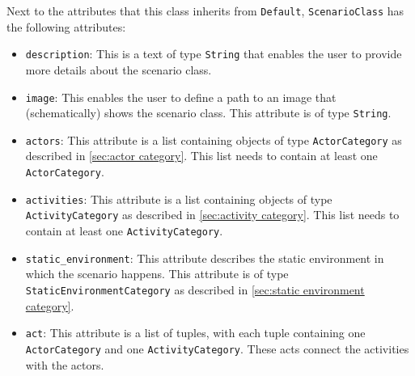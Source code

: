 \documentclass[10pt,final,a4paper,oneside,onecolumn]{article}
\theoremstyle{plain}\newtheorem{definition}{Definition}[section]    %
\theoremstyle{definition}\newtheorem{example}{Example}[section]     %
\theoremstyle{remark}\newtheorem{remarkenv}{Remark}[section]        %
\begin{document}
Next to the attributes that this class inherits from \texttt{Default}, \texttt{ScenarioClass} has the following attributes:
\begin{itemize}
	\item \texttt{description}: This is a text of type \texttt{String} that enables the user to provide more details about the scenario class.
	\item \texttt{image}: This enables the user to define a path to an image that (schematically) shows the scenario class. This attribute is of type \texttt{String}.
	\item \texttt{actors}: This attribute is a list containing objects of type \texttt{ActorCategory} as described in \cref{sec:actor category}. This list needs to contain at least one \texttt{ActorCategory}.
	\item \texttt{activities}: This attribute is a list containing objects of type \texttt{ActivityCategory} as described in \cref{sec:activity category}. This list needs to contain at least one \texttt{ActivityCategory}.
	\item \texttt{static\_environment}: This attribute describes the static environment in which the scenario happens. This attribute is of type \texttt{StaticEnvironmentCategory} as described in \cref{sec:static environment category}.
	\item \texttt{act}: This attribute is a list of tuples, with each tuple containing one \texttt{ActorCategory} and one \texttt{ActivityCategory}. These acts connect the activities with the actors. 
\end{itemize}
\end{document}
